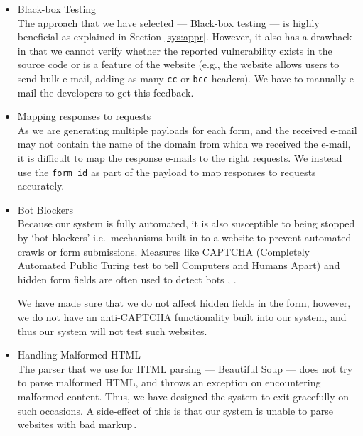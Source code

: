 \begin{itemize}
	\item Black-box Testing\\
	The approach that we have selected --- Black-box testing --- is highly beneficial as explained in Section \ref{sys:appr}. However, it also has a drawback in that we cannot verify whether the reported vulnerability exists in the source code or is a feature of the website (e.g., the website allows users to send bulk e-mail, adding as many \texttt{cc} or \texttt{bcc} headers). We have to manually e-mail the developers to get this feedback.
	
	\item Mapping responses to requests\\
	As we are generating multiple payloads for each form, and the received e-mail may not contain the name of the domain from which we received the e-mail, it is difficult to map the response e-mails to the right requests. We instead use the \texttt{form\_id} as part of the payload to map responses to requests accurately.
	
	\item Bot Blockers\\
	\label{issues:captcha}
    Because our system is fully automated, it is also susceptible to being stopped by `bot-blockers' i.e.\ mechanisms built-in to a website to prevent automated crawls or form submissions. Measures like CAPTCHA (Completely Automated Public Turing test to tell Computers and Humans Apart) and hidden form fields are often used to detect bots \cite{captchas3}, \cite{captchas2}.
    
    We have made sure that we do not affect hidden fields in the form, however, we do not have an anti-CAPTCHA functionality built into our system, and thus our system will not test such websites.
    
	\item Handling Malformed HTML\\
    The parser that we use for HTML parsing --- Beautiful Soup --- does not try to parse malformed HTML, and throws an exception on encountering malformed content. Thus, we have designed the system to exit gracefully on such occasions. A side-effect of this is that our system is unable to parse websites with bad markup\,\footnotemark.
    
	

\end{itemize}
